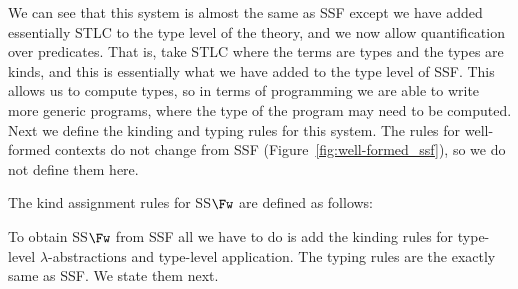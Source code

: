 We can see that this system is almost the same as SSF except we have
added essentially STLC to the type level of the theory, and we now
allow quantification over predicates.  That is, take STLC where the
terms are types and the types are kinds, and this is essentially what
we have added to the type level of SSF.  This allows us to compute
types, so in terms of programming we are able to write more generic
programs, where the type of the program may need to be computed.  Next
we define the kinding and typing rules for this system.  The rules for
well-formed contexts do not change from SSF
(Figure~\ref{fig:well-formed_ssf}), so we do not define them here.

\begin{definition}
  \label{def:l_kinding_rules_ssfw}
  The kind assignment rules for SS$\Fw$ are defined as follows:
  \begin{center}
  \end{center}
\end{definition}
\noindent
To obtain SS$\Fw$ from SSF all we have to do is add the kinding rules
for type-level $\lambda$-abstractions and type-level application.  The
typing rules are the exactly same as SSF.  We state them next.

